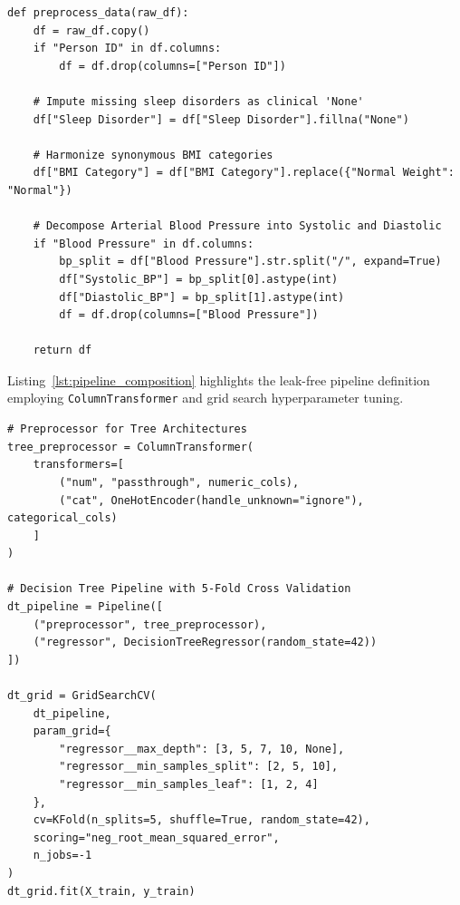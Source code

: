 \documentclass[12pt,a4paper]{article}
\begin{document}
\begin{lstlisting}[caption={Blood Pressure Decomposition and Categorical Sanitation in Python},label={lst:preprocessing}]
def preprocess_data(raw_df):
    df = raw_df.copy()
    if "Person ID" in df.columns:
        df = df.drop(columns=["Person ID"])
    
    # Impute missing sleep disorders as clinical 'None'
    df["Sleep Disorder"] = df["Sleep Disorder"].fillna("None")
    
    # Harmonize synonymous BMI categories
    df["BMI Category"] = df["BMI Category"].replace({"Normal Weight": "Normal"})
    
    # Decompose Arterial Blood Pressure into Systolic and Diastolic
    if "Blood Pressure" in df.columns:
        bp_split = df["Blood Pressure"].str.split("/", expand=True)
        df["Systolic_BP"] = bp_split[0].astype(int)
        df["Diastolic_BP"] = bp_split[1].astype(int)
        df = df.drop(columns=["Blood Pressure"])
        
    return df
\end{lstlisting}

Listing~\ref{lst:pipeline_composition} highlights the leak-free pipeline definition employing \texttt{ColumnTransformer} and grid search hyperparameter tuning.

\begin{lstlisting}[caption={Preprocessing Pipeline and Hyperparameter Tuning},label={lst:pipeline_composition}]
# Preprocessor for Tree Architectures
tree_preprocessor = ColumnTransformer(
    transformers=[
        ("num", "passthrough", numeric_cols),
        ("cat", OneHotEncoder(handle_unknown="ignore"), categorical_cols)
    ]
)

# Decision Tree Pipeline with 5-Fold Cross Validation
dt_pipeline = Pipeline([
    ("preprocessor", tree_preprocessor),
    ("regressor", DecisionTreeRegressor(random_state=42))
])

dt_grid = GridSearchCV(
    dt_pipeline,
    param_grid={
        "regressor__max_depth": [3, 5, 7, 10, None],
        "regressor__min_samples_split": [2, 5, 10],
        "regressor__min_samples_leaf": [1, 2, 4]
    },
    cv=KFold(n_splits=5, shuffle=True, random_state=42),
    scoring="neg_root_mean_squared_error",
    n_jobs=-1
)
dt_grid.fit(X_train, y_train)
\end{lstlisting}
\end{document}
